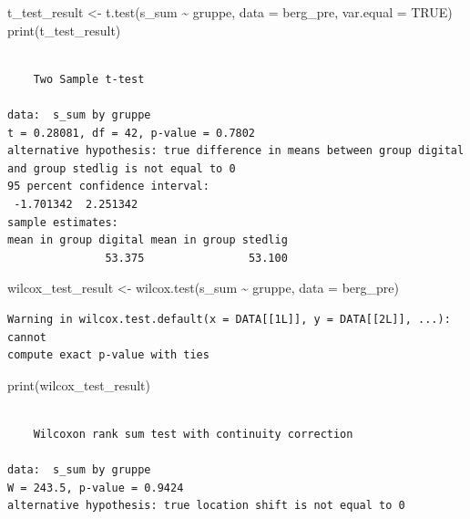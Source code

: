 \documentclass[
  letterpaper,
  DIV=11,
  numbers=noendperiod]{scrreprt}
\newenvironment{Shaded}{\begin{snugshade}}{\end{snugshade}}
\newcommand{\AttributeTok}[1]{\textcolor[rgb]{0.40,0.45,0.13}{#1}}
\newcommand{\ConstantTok}[1]{\textcolor[rgb]{0.56,0.35,0.01}{#1}}
\newcommand{\FunctionTok}[1]{\textcolor[rgb]{0.28,0.35,0.67}{#1}}
\newcommand{\NormalTok}[1]{\textcolor[rgb]{0.00,0.23,0.31}{#1}}
\newcommand{\OtherTok}[1]{\textcolor[rgb]{0.00,0.23,0.31}{#1}}
\newcommand{\SpecialCharTok}[1]{\textcolor[rgb]{0.37,0.37,0.37}{#1}}
\begin{document}
\begin{Shaded}
\begin{Highlighting}[]
\NormalTok{t\_test\_result }\OtherTok{\textless{}{-}} \FunctionTok{t.test}\NormalTok{(s\_sum }\SpecialCharTok{\textasciitilde{}}\NormalTok{ gruppe, }\AttributeTok{data =}\NormalTok{ berg\_pre, }\AttributeTok{var.equal =} \ConstantTok{TRUE}\NormalTok{) }
\FunctionTok{print}\NormalTok{(t\_test\_result)}
\end{Highlighting}
\end{Shaded}

\begin{verbatim}

    Two Sample t-test

data:  s_sum by gruppe
t = 0.28081, df = 42, p-value = 0.7802
alternative hypothesis: true difference in means between group digital and group stedlig is not equal to 0
95 percent confidence interval:
 -1.701342  2.251342
sample estimates:
mean in group digital mean in group stedlig 
               53.375                53.100 
\end{verbatim}

\begin{Shaded}
\begin{Highlighting}[]
\NormalTok{wilcox\_test\_result }\OtherTok{\textless{}{-}} \FunctionTok{wilcox.test}\NormalTok{(s\_sum }\SpecialCharTok{\textasciitilde{}}\NormalTok{ gruppe, }\AttributeTok{data =}\NormalTok{ berg\_pre)}
\end{Highlighting}
\end{Shaded}

\begin{verbatim}
Warning in wilcox.test.default(x = DATA[[1L]], y = DATA[[2L]], ...): cannot
compute exact p-value with ties
\end{verbatim}

\begin{Shaded}
\begin{Highlighting}[]
\FunctionTok{print}\NormalTok{(wilcox\_test\_result)}
\end{Highlighting}
\end{Shaded}

\begin{verbatim}

    Wilcoxon rank sum test with continuity correction

data:  s_sum by gruppe
W = 243.5, p-value = 0.9424
alternative hypothesis: true location shift is not equal to 0
\end{verbatim}
\end{document}
